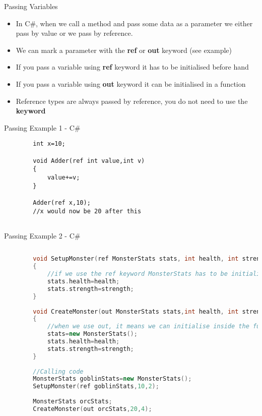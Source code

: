\begin{frame}{Passing Variables}
	\begin{itemize}
		\pause \item In C\#, when we call a method and pass some data as a parameter we either pass by value or we pass by reference. 
		\pause \item We can mark a parameter with the \textbf{ref} or \textbf{out} keyword (see example)
		\pause \item If you pass a variable using \textbf{ref} keyword it has to be initialised before hand
		\pause \item If you pass a variable using \textbf{out} keyword it can be initialised in a function
		\pause \item Reference types are always passed by reference, you do not need to use the \textbf{keyword}
	\end{itemize}
\end{frame}

\begin{frame}[fragile]{Passing Example 1 - C\#}
	\begin{lstlisting}
		int x=10;
		
		void Adder(ref int value,int v)
		{
			value+=v;	
		}
		
		Adder(ref x,10);
		//x would now be 20 after this		
	
	\end{lstlisting}
\end{frame}

\begin{frame}[fragile]{Passing Example 2 - C\#}
	\begin{lstlisting}[language=C++,basicstyle=\tiny,]
	
		void SetupMonster(ref MonsterStats stats, int health, int strength)
		{
			//if we use the ref keyword MonsterStats has to be initialised
			stats.health=health;
			stats.strength=strength;
		}
		
		void CreateMonster(out MonsterStats stats,int health, int strength)
		{
			//when we use out, it means we can initialise inside the function
			stats=new MonsterStats();
			stats.health=health;
			stats.strength=strength;
		}
		
		//Calling code
		MonsterStats goblinStats=new MonsterStats();
		SetupMonster(ref goblinStats,10,2);
		
		MonsterStats orcStats;
		CreateMonster(out orcStats,20,4);
	\end{lstlisting}
\end{frame}

